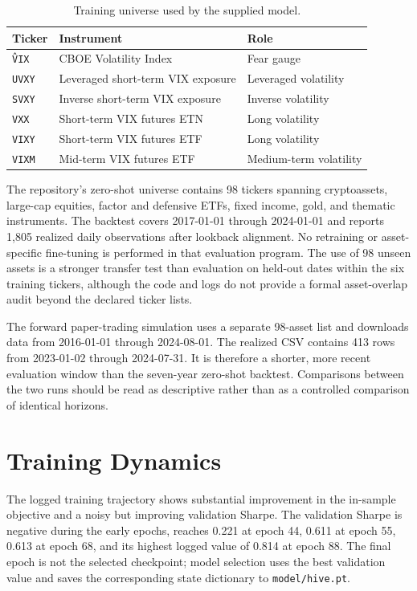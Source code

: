 \documentclass[10pt,a4paper,twocolumn]{article}
\newcommand{\code}[1]{\texttt{#1}}
\begin{document}
\begin{table}[t]
\centering
\caption{Training universe used by the supplied model.}
\label{tab:trainassets}
\small
\begin{tabular}{@{}lll@{}}
\toprule
Ticker & Instrument & Role \\
\midrule
\code{\^VIX} & CBOE Volatility Index & Fear gauge \\
\code{UVXY} & Leveraged short-term VIX exposure & Leveraged volatility \\
\code{SVXY} & Inverse short-term VIX exposure & Inverse volatility \\
\code{VXX} & Short-term VIX futures ETN & Long volatility \\
\code{VIXY} & Short-term VIX futures ETF & Long volatility \\
\code{VIXM} & Mid-term VIX futures ETF & Medium-term volatility \\
\bottomrule
\end{tabular}
\end{table}

The repository's zero-shot universe contains 98 tickers spanning cryptoassets, large-cap equities, factor and defensive ETFs, fixed income, gold, and thematic instruments. The backtest covers 2017-01-01 through 2024-01-01 and reports 1,805 realized daily observations after lookback alignment. No retraining or asset-specific fine-tuning is performed in that evaluation program. The use of 98 unseen assets is a stronger transfer test than evaluation on held-out dates within the six training tickers, although the code and logs do not provide a formal asset-overlap audit beyond the declared ticker lists.

The forward paper-trading simulation uses a separate 98-asset list and downloads data from 2016-01-01 through 2024-08-01. The realized CSV contains 413 rows from 2023-01-02 through 2024-07-31. It is therefore a shorter, more recent evaluation window than the seven-year zero-shot backtest. Comparisons between the two runs should be read as descriptive rather than as a controlled comparison of identical horizons.

\section{Training Dynamics}
The logged training trajectory shows substantial improvement in the in-sample objective and a noisy but improving validation Sharpe. The validation Sharpe is negative during the early epochs, reaches 0.221 at epoch 44, 0.611 at epoch 55, 0.613 at epoch 68, and its highest logged value of 0.814 at epoch 88. The final epoch is not the selected checkpoint; model selection uses the best validation value and saves the corresponding state dictionary to \code{model/hive.pt}.
\end{document}
